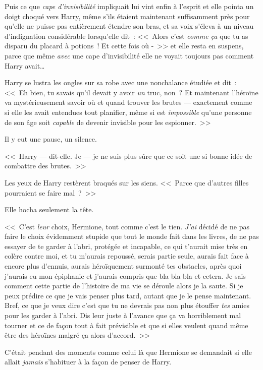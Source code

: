Puis ce que \emph{cape d'invisibilité} impliquait lui vint enfin à l'esprit et elle pointa un doigt choqué vers Harry, même s'ils étaient maintenant suffisamment près pour qu'elle ne puisse pas entièrement étendre son bras, et sa voix s'éleva à un niveau d'indignation considérable lorsqu'elle dit~: <<~Alors c'est \emph{comme ça} que tu as disparu du placard à potions~! Et cette fois où -~>> et elle resta en suspens, parce que même \emph{avec} une cape d'invisibilité elle ne voyait toujours pas comment Harry avait…

Harry se lustra les ongles sur sa robe avec une nonchalance étudiée et dit~: <<~Eh bien, tu savais qu'il devait y avoir \emph{un} truc, non~? Et maintenant l'héroïne va mystérieusement savoir où et quand trouver les brutes — exactement comme si elle les avait entendues tout planifier, même si est \emph{impossible} qu'une personne de son âge soit \emph{capable} de devenir invisible pour les espionner.~>>

Il y eut une pause, un silence.

<<~Harry — dit-elle. Je — je ne suis plus sûre que ce soit une si bonne idée de combattre des brutes.~>>

Les yeux de Harry restèrent braqués sur les siens. <<~Parce que d'autres filles pourraient se faire mal~?~>>

Elle hocha seulement la tête.

<<~C'est \emph{leur} choix, Hermione, tout comme c'est le tien. \emph{J'ai} décidé de ne pas faire le choix évidemment stupide que tout le monde fait dans les livres, de ne pas essayer de te garder à l'abri, protégée et incapable, ce qui t'aurait mise très en colère contre moi, et tu m'aurais repoussé, serais partie seule, aurais fait face à encore plus d'ennuis, aurais héroïquement surmonté tes obstacles, après quoi j'aurais eu mon épiphanie et j'aurais compris que bla bla bla et cetera. Je sais comment cette partie de l'histoire de ma vie se déroule alors je la saute. Si je peux prédire ce que je vais penser plus tard, autant que je le pense maintenant. Bref, ce que je veux dire c'est que tu ne devrais pas non plus étouffer \emph{tes} amies pour les garder à l'abri. Dis leur juste à l'avance que ça va horriblement mal tourner et ce de façon tout à fait prévisible et que si elles veulent quand même être des héroïnes malgré ça alors d'accord.~>>

C'était pendant des moments comme celui là que Hermione se demandait si elle allait \emph{jamais} s'habituer à la façon de penser de Harry.

